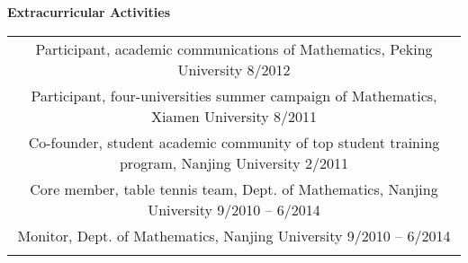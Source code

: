 \documentclass[letterpaper,10pt]{article}
\newcommand{\resheading}[1]{{\large \colorbox{mygrey}{\begin{minipage}{\textwidth}{\textbf{#1 \vphantom{p\^{E}}}}\end{minipage}}}}
\begin{document}
\resheading{Extracurricular Activities}
\begin{center}
\begin{tabular*}{6.5in}{l@{\extracolsep{\fill}}r}
\multicolumn{2}{c}{Participant, academic communications of Mathematics, Peking University \cftdotfill{\cftdotsep}8/2012} \\
\multicolumn{2}{c}{Participant, four-universities summer campaign of Mathematics, Xiamen University \cftdotfill{\cftdotsep}8/2011} \\
\multicolumn{2}{c}{Co-founder, student academic community of top student training program, Nanjing University \cftdotfill{\cftdotsep}2/2011} \\
\multicolumn{2}{c}{Core member, table tennis team, Dept. of Mathematics, Nanjing University \cftdotfill{\cftdotsep}9/2010 -- 6/2014} \\
\multicolumn{2}{c}{Monitor, Dept. of Mathematics, Nanjing University \cftdotfill{\cftdotsep}9/2010 -- 6/2014} \\
\vphantom{E}
\end{tabular*}
\end{center}


\end{document}
